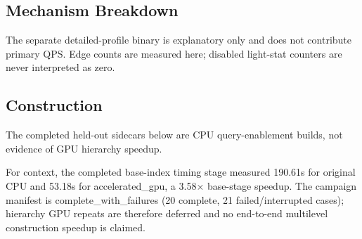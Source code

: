 {\subsection{Mechanism Breakdown}
The separate detailed-profile binary is explanatory only and does not contribute primary QPS. Edge counts are measured here; disabled light-stat counters are never interpreted as zero.
\begin{table}[t]
\centering
\small
\caption{Detailed profile at each held-out dataset's broader workload (ms/query and mean work per query).}
\label{tab:profile}
\end{table}

\subsection{Construction}
The completed held-out sidecars below are CPU query-enablement builds, not evidence of GPU hierarchy speedup.
\begin{table}[t]
\centering
\small
\caption{Automatic DRH CPU sidecar construction.}
\label{tab:sidecar-build}
\end{table}
For context, the completed base-index timing stage measured 190.61s for original CPU and 53.18s for accelerated\_gpu, a 3.58$\times$ base-stage speedup. The campaign manifest is complete\_with\_failures (20 complete, 21 failed/interrupted cases); hierarchy GPU repeats are therefore deferred and no end-to-end multilevel construction speedup is claimed.
}
